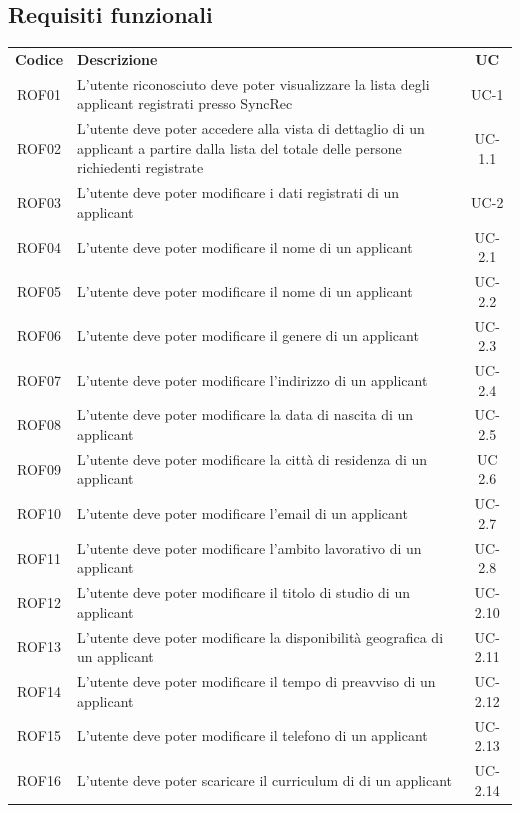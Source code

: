 \subsection{Requisiti funzionali}
\begin{center}
	\begin{tabularx}{\textwidth}{|c|X|c|}
		\hline
		\textbf{Codice} & \textbf{Descrizione} & \textbf{UC} \\
		ROF01 & L'utente riconosciuto deve poter visualizzare la lista degli applicant registrati presso SyncRec & UC-1 \\
		\hline
		ROF02 & L'utente deve poter accedere alla vista di dettaglio di un applicant a partire dalla lista del totale delle persone richiedenti registrate & UC-1.1 \\
		\hline
		ROF03 & L'utente deve poter modificare i dati registrati di un applicant & UC-2 \\
		\hline
		ROF04 & L'utente deve poter modificare il nome di un applicant & UC-2.1 \\
		\hline
		ROF05 & L'utente deve poter modificare il nome di un applicant & UC-2.2 \\
		\hline
		ROF06 & L'utente deve poter modificare il genere di un applicant & UC-2.3\\
		\hline
		ROF07 & L'utente deve poter modificare l'indirizzo di un applicant & UC-2.4 \\
		\hline
		ROF08 &  L'utente deve poter modificare la data di nascita di un applicant & UC-2.5 \\
		\hline
		ROF09 & L'utente deve poter modificare la città di residenza di un applicant & UC 2.6 \\
		\hline
		ROF10 & L'utente deve poter modificare l'email di un applicant & UC-2.7\\
		\hline
		ROF11 & L'utente deve poter modificare l'ambito lavorativo di un applicant &  UC-2.8\\
		\hline
		ROF12 & L'utente deve poter modificare il titolo di studio di un applicant & UC-2.10 \\
		\hline
		ROF13 & L'utente deve poter modificare la disponibilità geografica di un applicant & UC-2.11\\
		\hline
		ROF14 & L'utente deve poter modificare il tempo di preavviso di un applicant & UC-2.12\\
		\hline
		ROF15 & L'utente deve poter modificare il telefono di un applicant & UC-2.13 \\
		\hline
		ROF16 & L'utente deve poter scaricare il curriculum di di un applicant & UC-2.14\\

\end{tabularx}
\end{center}
